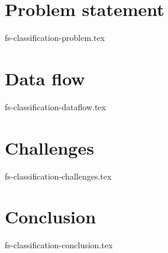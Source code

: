 \documentclass[sigconf]{acmart}
\theoremstyle{remark}
\begin{document}
\section {Problem statement}
 {fs-classification-problem.tex}

\section {Data flow}
 {fs-classification-dataflow.tex}

\section {Challenges}
 {fs-classification-challenges.tex}

\section {Conclusion}
 {fs-classification-conclusion.tex}



\end{document}

